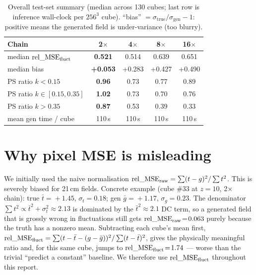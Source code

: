 \documentclass[11pt,a4paper]{article}
\newcommand{\relMSE}{\text{rel\_MSE}}
\newcommand{\relMSEf}{\text{rel\_MSE}_{\rm fluct}}
\begin{document}
\begin{table}[ht]
\centering
\caption{Overall test-set summary (median across 130 cubes; last row is inference
wall-clock per $256^3$ cube).  ``bias'' $=\sigma_\mathrm{true}/\sigma_\mathrm{gen}-1$:
positive means the generated field is under-variance (too blurry).}
\label{tab:summary}
\begin{tabular}{lcccc}
\toprule
Chain               & 2$\times$        & 4$\times$        & 8$\times$        & 16$\times$       \\
\midrule
median $\relMSE_{\rm fluct}$ & \textbf{0.521}   & 0.514            & 0.639            & 0.651            \\
median bias         & \textbf{+0.053}  & +0.283           & +0.427           & +0.490           \\
PS ratio $k\!<\!0.15$   & \textbf{0.96}& 0.73             & 0.77             & 0.89             \\
PS ratio $k\!\in[0.15,0.35]$ & \textbf{1.02}& 0.73        & 0.70             & 0.76             \\
PS ratio $k\!>\!0.35$   & \textbf{0.87}& 0.53             & 0.39             & 0.33             \\
mean gen time / cube    & 110\,s       & 110\,s           & 110\,s           & 110\,s           \\
\bottomrule
\end{tabular}
\end{table}

\section{Why pixel MSE is misleading}
\label{sec:mse-trap}

We initially used the naive normalisation
$\text{rel\_MSE}_{\rm raw}=\sum(t-g)^2/\sum t^2$.  This is severely biased for
21\,cm fields.  Concrete example (cube \#33 at $z\!=\!10$, 2$\times$ chain):
true $\bar t\!=\!+1.45$, $\sigma_t\!=\!0.18$; gen $\bar g\!=\!+1.17$,
$\sigma_g\!=\!0.23$.  The denominator
$\sum t^2 \propto \bar t^2 + \sigma_t^2 \approx 2.13$ is dominated by the
$\bar t^2\!\approx\!2.1$ DC term, so a generated field that is grossly wrong in
fluctuations still gets $\text{rel\_MSE}_{\rm raw}\!=\!0.063$ purely because the
truth has a nonzero mean.  Subtracting each cube's mean first,
$\relMSEf=\sum(t-\bar t-(g-\bar g))^2/\sum(t-\bar t)^2$,
gives the physically meaningful ratio and, for this same cube, jumps to
$\relMSEf\!=\!1.74$ --- worse than the trivial ``predict a constant'' baseline.
We therefore use $\relMSEf$ throughout this report.
\end{document}
